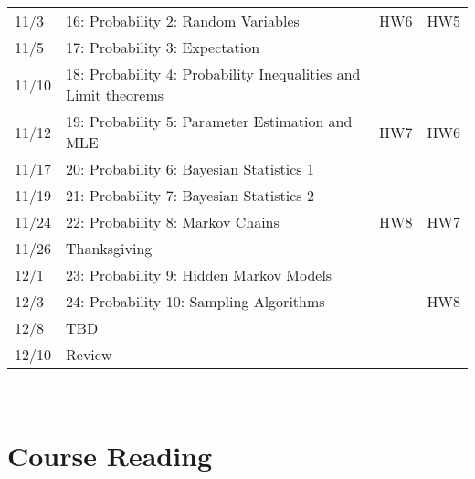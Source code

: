 \documentclass[11pt]{article}
\begin{document}
\begin{centering}
\begin{tabular}{||l|p{3in}|l|l||}
11/3 & 16: Probability 2: Random Variables  & HW6  & HW5  \\ 
11/5 & 17: Probability 3: Expectation &  &  \\ 
\hline

11/10 & 18: Probability 4: Probability Inequalities and Limit theorems&   & \\  
11/12& 19: Probability 5: Parameter Estimation and MLE   & HW7 & HW6   \\  
\hline
11/17 & 20: Probability 6: Bayesian Statistics 1 &   & \\  
11/19& 21: Probability 7: Bayesian Statistics 2 &  &   \\  
\hline
11/24 & 22: Probability 8: Markov Chains  & HW8  & HW7 \\
11/26 & Thanksgiving &   &  \\  
\hline

12/1 & 23: Probability 9: Hidden Markov Models &  &  \\
12/3 & 24: Probability 10: Sampling Algorithms &   & HW8 \\ 
\hline
12/8& TBD &  &  \\
12/10& Review &  &  \\

\hline\hline

\end{tabular}\\
\end{centering}

\section*{Course Reading}
\end{document}
